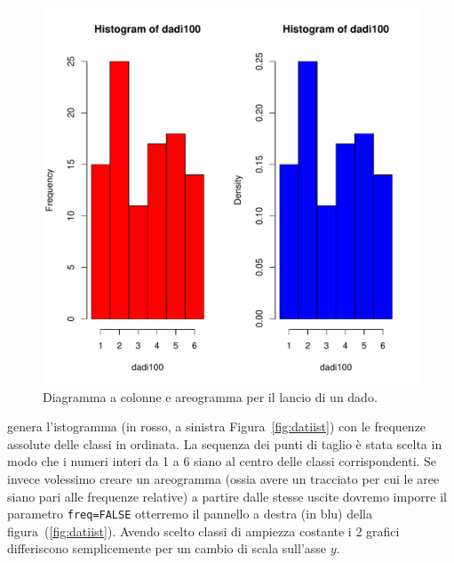 \documentclass[onecolumn,12pt]{book}\usepackage[]{graphicx}\usepackage[]{color}
\makeatletter
\def\maxwidth{ %
  \ifdim\Gin@nat@width>\linewidth
    \linewidth
  \else
    \Gin@nat@width
  \fi
}
\newenvironment{knitrout}{}{} %
\makeatother
\begin{document}
\begin{figure}[htbp]
\begin{center}
\begin{knitrout}
\color{fgcolor}
\includegraphics[width=\maxwidth]{figure/unnamed-chunk-106-1} 

\end{knitrout}
\caption{Diagramma a colonne e areogramma per il lancio di un dado.}
\label{fig:datidado}
\end{center}
\end{figure}
genera l'istogramma (in rosso, a sinistra Figura~\ref{fig:datiist}) con le frequenze assolute delle classi in ordinata. La sequenza dei punti di taglio \`e stata scelta in modo che i numeri interi da 1 a 6 siano al centro delle classi corrispondenti. Se invece volessimo creare un areogramma  (ossia avere un tracciato per cui le aree siano pari alle frequenze relative) a partire dalle stesse uscite dovremo imporre il parametro \texttt{freq=FALSE} otterremo il pannello a destra (in blu) della figura~(\ref{fig:datiist}). Avendo scelto classi di ampiezza costante i 2 grafici differiscono semplicemente per un cambio di scala sull'asse $y$.
\end{document}
